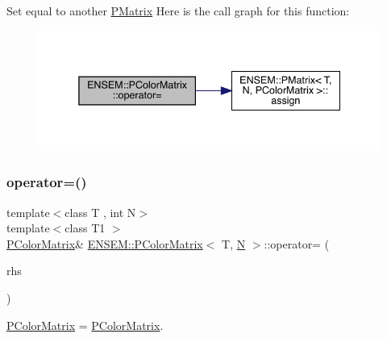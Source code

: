 Set equal to another \mbox{\hyperlink{classENSEM_1_1PMatrix}{P\+Matrix}} Here is the call graph for this function\+:
\nopagebreak
\begin{figure}[H]
\begin{center}
\leavevmode
\includegraphics[width=338pt]{d8/d21/classENSEM_1_1PColorMatrix_a529b6a2c63f2087a6a336af14b6f80eb_cgraph}
\end{center}
\end{figure}
\mbox{\label{classENSEM_1_1PColorMatrix_a529b6a2c63f2087a6a336af14b6f80eb}} 
\subsubsection{\texorpdfstring{operator=()}{operator=()}\hspace{0.1cm}{\footnotesize\ttfamily [4/4]}}
{\footnotesize\ttfamily template$<$class T , int N$>$ \\
template$<$class T1 $>$ \\
\mbox{\hyperlink{classENSEM_1_1PColorMatrix}{P\+Color\+Matrix}}\& \mbox{\hyperlink{classENSEM_1_1PColorMatrix}{E\+N\+S\+E\+M\+::\+P\+Color\+Matrix}}$<$ T, \mbox{\hyperlink{operator__name__util_8cc_a7722c8ecbb62d99aee7ce68b1752f337}{N}} $>$\+::operator= (\begin{DoxyParamCaption}\item[{const \mbox{\hyperlink{classENSEM_1_1PColorMatrix}{P\+Color\+Matrix}}$<$ T1, \mbox{\hyperlink{operator__name__util_8cc_a7722c8ecbb62d99aee7ce68b1752f337}{N}} $>$ \&}]{rhs }\end{DoxyParamCaption})\hspace{0.3cm}{\ttfamily [inline]}}



\mbox{\hyperlink{classENSEM_1_1PColorMatrix}{P\+Color\+Matrix}} = \mbox{\hyperlink{classENSEM_1_1PColorMatrix}{P\+Color\+Matrix}}. 

